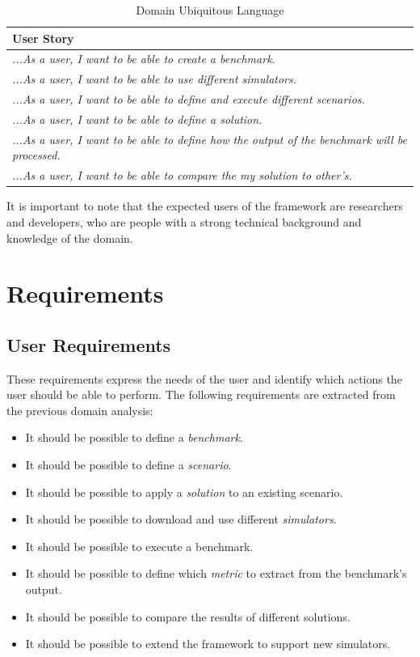 \documentclass[12pt,a4paper,openright,twoside]{book}
\begin{document}
\begin{table}[H]
  \centering
  \begin{tabular}{|p{}|}
  \toprule
  \textbf{User Story} \\
  \midrule                                                                                                                                                              
  \textit{...As a user, I want to be able to create a benchmark.} \\ \hline
  \textit{...As a user, I want to be able to use different simulators.} \\ \hline
  \textit{...As a user, I want to be able to define and execute different scenarios.} \\ \hline
  \textit{...As a user, I want to be able to define a solution.} \\ \hline
  \textit{...As a user, I want to be able to define how the output of the benchmark will be processed.} \\ \hline
  \textit{...As a user, I want to be able to compare the my solution to other's.} \\ \hline
  \end{tabular}
  \caption{Domain Ubiquitous Language}
\end{table}

It is important to note that the expected users of the framework are researchers and developers,
who are people with a strong technical background and knowledge of the domain.

\section{Requirements}

\subsection*{User Requirements}
These requirements express the needs of the user and identify which actions the user should be able to perform.
The following requirements are extracted from the previous domain analysis:
\begin{itemize}
  \item It should be possible to define a \emph{benchmark}.
  \item It should be possible to define a \emph{scenario}.
  \item It should be possible to apply a \emph{solution} to an existing scenario.
  \item It should be possible to download and use different \emph{simulators}.
  \item It should be possible to execute a benchmark.
  \item It should be possible to define which \emph{metric} to extract from the benchmark's output.
  \item It should be possible to compare the results of different solutions.
  \item It should be possible to extend the framework to support new simulators.
\end{itemize}
\end{document}
